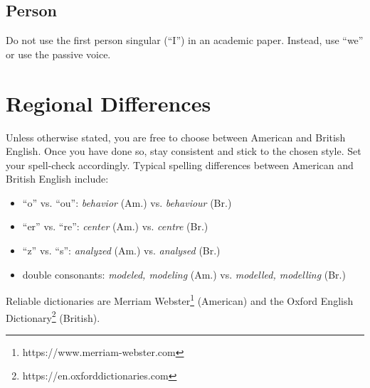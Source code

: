 \subsection{Person}
Do not use the first person singular (``I'') in an academic paper. Instead, use ``we'' or use the passive voice.

\section{Regional Differences}
Unless otherwise stated, you are free to choose between American and British English. Once you have done so, stay consistent and stick to the chosen style. Set your spell-check accordingly. Typical spelling differences between American and British English include:

\begin{itemize}
	\item ``o'' vs. ``ou'': \textit{behavior} (Am.) vs. \textit{behaviour} (Br.)
	\item ``er'' vs. ``re'': \textit{center} (Am.) vs. \textit{centre} (Br.)
	\item ``z'' vs. ``s'': \textit{analyzed} (Am.) vs. \textit{analysed} (Br.)
	\item double consonants: \textit{modeled, modeling} (Am.) vs. \textit{modelled, modelling} (Br.) 
\end{itemize}

Reliable dictionaries are Merriam Webster\footnote{https://www.merriam-webster.com} (American) and the Oxford English Dictionary\footnote{https://en.oxforddictionaries.com} (British).